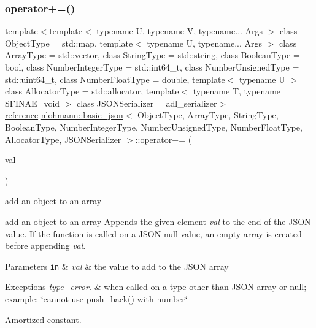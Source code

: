 \subsubsection{\texorpdfstring{operator+=()}{operator+=()}\hspace{0.1cm}{\footnotesize\ttfamily [1/4]}}
{\footnotesize\ttfamily template$<$template$<$ typename U, typename V, typename... Args $>$ class Object\+Type = std\+::map, template$<$ typename U, typename... Args $>$ class Array\+Type = std\+::vector, class String\+Type  = std\+::string, class Boolean\+Type  = bool, class Number\+Integer\+Type  = std\+::int64\+\_\+t, class Number\+Unsigned\+Type  = std\+::uint64\+\_\+t, class Number\+Float\+Type  = double, template$<$ typename U $>$ class Allocator\+Type = std\+::allocator, template$<$ typename T, typename S\+F\+I\+N\+A\+E=void $>$ class J\+S\+O\+N\+Serializer = adl\+\_\+serializer$>$ \\
\mbox{\hyperlink{classnlohmann_1_1basic__json_ac6a5eddd156c776ac75ff54cfe54a5bc}{reference}} \mbox{\hyperlink{classnlohmann_1_1basic__json}{nlohmann\+::basic\+\_\+json}}$<$ Object\+Type, Array\+Type, String\+Type, Boolean\+Type, Number\+Integer\+Type, Number\+Unsigned\+Type, Number\+Float\+Type, Allocator\+Type, J\+S\+O\+N\+Serializer $>$\+::operator+= (\begin{DoxyParamCaption}\item[{\mbox{\hyperlink{classnlohmann_1_1basic__json}{basic\+\_\+json}}$<$ Object\+Type, Array\+Type, String\+Type, Boolean\+Type, Number\+Integer\+Type, Number\+Unsigned\+Type, Number\+Float\+Type, Allocator\+Type, J\+S\+O\+N\+Serializer $>$ \&\&}]{val }\end{DoxyParamCaption})\hspace{0.3cm}{\ttfamily [inline]}}



add an object to an array 

add an object to an array Appends the given element {\itshape val} to the end of the J\+S\+ON value. If the function is called on a J\+S\+ON null value, an empty array is created before appending {\itshape val}.


\begin{DoxyParams}[1]{Parameters}
\mbox{\tt in}  & {\em val} & the value to add to the J\+S\+ON array\\
\hline
\end{DoxyParams}

\begin{DoxyExceptions}{Exceptions}
{\em type\+\_\+error.} & when called on a type other than J\+S\+ON array or null; example\+: {\ttfamily \char`\"{}cannot use push\+\_\+back() with number\char`\"{}}\\
\hline
\end{DoxyExceptions}
Amortized constant.

